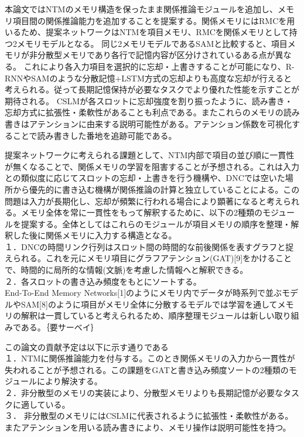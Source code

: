 本論文ではNTMのメモリ構造を保ったまま関係推論モジュールを追加し、メモリ項目間の関係推論能力を追加することを提案する。関係メモリにはRMCを用いるため、提案ネットワークはNTMを項目メモリ、RMCを関係メモリとして持つ2メモリモデルとなる。
同じ2メモリモデルであるSAMと比較すると、項目メモリが非分散型メモリであり各行で記憶内容が区分けされているある点が異なる。
これにより各入力項目を選択的に忘却・上書きすることが可能になり、R-RNNやSAMのような分散記憶+LSTM方式の忘却よりも高度な忘却が行えると考えられる。従って長期記憶保持が必要なタスクでより優れた性能を示すことが期待される。
CSLMが各スロットに忘却強度を割り振ったように、読み書き・忘却方式に拡張性・柔軟性があることも利点である。またこれらのメモリの読み書きはアテンションに由来する説明可能性がある。アテンション係数を可視化することで読み書きした番地を追跡可能である。

提案ネットワークに考えられる課題として、NTM内部で項目の並び順に一貫性が無くなることで、関係メモリの学習を阻害することが予想される。これは入力との類似度に応じてスロットの忘却・上書きを行う機構や、DNCでは空いた場所から優先的に書き込む機構が関係推論の計算と独立していることによる。この問題は入力が長期化し、忘却が頻繁に行われる場合により顕著になると考えられる。メモリ全体を常に一貫性をもって解釈するために、以下の2種類のモジュールを提案する。全体としてはこれらのモジュールが項目メモリの順序を整理・解釈した後に関係メモリに入力する構造となる。
\\１．DNCの時間リンク行列はスロット間の時間的な前後関係を表すグラフと捉えられる。これを元にメモリ項目にグラフアテンション(GAT)[9]をかけることで、時間的に局所的な情報(文脈)を考慮した情報へと解釈できる。
\\２．各スロットの書き込み頻度をもとにソートする。
\\End-To-End Memory Networks[1]のようにメモリ内でデータが時系列で並ぶモデルやSAM[8]のように項目がメモリ全体に分散するモデルでは学習を通してメモリの解釈は一貫していると考えられるため、順序整理モジュールは新しい取り組みである。｛要サーベイ｝

この論文の貢献{予定}は以下に示す通りである
\\１．NTMに関係推論能力を付与する。このとき関係メモリの入力から一貫性が失われることが予想される。この課題をGATと書き込み頻度ソートの2種類のモジュールにより解決する。
\\２．非分散型のメモリの実装により、分散型メモリよりも長期記憶が必要なタスクに適している。
\\３． 非分散型のメモリにはCSLMに代表されるように拡張性・柔軟性がある。またアテンションを用いる読み書きにより、メモリ操作は説明可能性を持つ。

